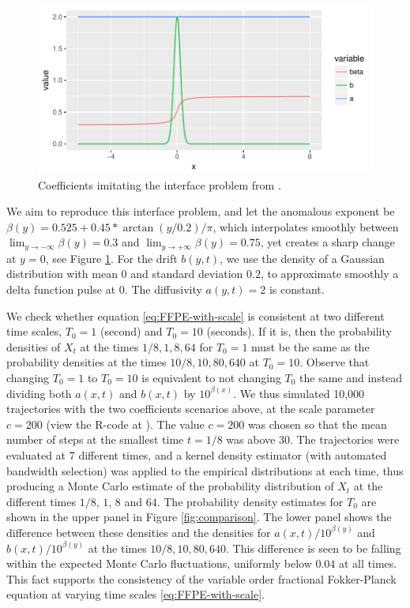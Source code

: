 \documentclass[a4paper,12pt]{elsarticle}
\numberwithin{equation}{section}
\theoremstyle{plain}
\theoremstyle{definition}
\theoremstyle{remark}
\numberwithin{equation}{section}
\newcommand{\1}{\mathbf 1}
\begin{document}
\begin{figure}
  \centering
  \includegraphics{beta_b}
  \caption{\label{fig:beta_b}Coefficients imitating the interface problem from \cite{Korabel2010}.}
\end{figure}

We aim to reproduce this interface problem, and 
let the anomalous exponent be $\beta(y) = 0.525 + 0.45 * \arctan(y/0.2)/ \pi$, 
which interpolates smoothly between $\lim_{y \to -\infty} \beta(y) = 0.3$ 
and $\lim_{y \to +\infty} \beta(y) = 0.75$, yet creates a sharp change at $y=0$, see Figure \ref{fig:beta_b}.
For the drift $b(y,t)$, we use the density of a Gaussian distribution with 
mean $0$ and standard deviation $0.2$, to approximate smoothly a 
delta function pulse at $0$.
The diffusivity $a(y,t) = 2$ is constant. 

We check whether equation \eqref{eq:FFPE-with-scale} is consistent at two 
different time scales, $T_0 = 1$ (second) and $T_0 = 10$ (seconds).
If it is, then the probability densities of $X_t$ at the times 
$1/8, 1, 8, 64$ for $T_0 = 1$ must be the same as the probability 
densities at the times $10/8, 10, 80, 640$ at $T_0 = 10$.
Observe that changing $T_0 = 1$ to 
$T_0 = 10$ is equivalent to not changing $T_0$ the same and instead 
dividing both $a(x,t)$ and $b(x,t)$ by $10^{\beta(x)}$. 
We thus 
simulated 10,000 trajectories with the two coefficients scenarios above, 
at the scale 
parameter $c = 200$ (view the R-code at \cite{var-order-MC}).
The value $c = 200$ was chosen so that the mean number of steps at the smallest time $t = 1/8$ was above $30$. The trajectories were evaluated at 7 different times, and a kernel density estimator (with automated bandwidth selection) was applied
to the empirical distributions at each time, thus producing a Monte Carlo 
estimate of the probability distribution of $X_t$ at the different times 
$1/8$, $1$, $8$ and $64$.
The probability density estimates for $T_0$ are shown in the upper panel 
in Figure \ref{fig:comparison}. 
The lower panel shows the difference between these densities and the 
densities for $a(x,t) / 10^{\beta(y)}$ and $b(x,t) / 10^{\beta(y)}$
at the times $10/8, 10, 80, 640$. 
This difference is seen to be falling within the expected Monte Carlo 
fluctuations, uniformly below $0.04$ at all times. 
This fact supports the consistency of the variable order fractional 
Fokker-Planck equation at varying time scales \eqref{eq:FFPE-with-scale}. 
\end{document}
